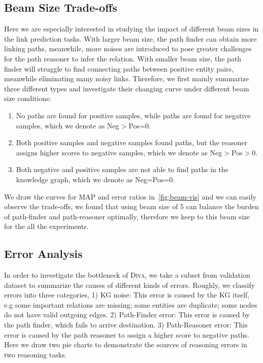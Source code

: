 \documentclass[11pt,a4paper]{article}
\begin{document}
\subsection{Beam Size Trade-offs}
Here we are especially interested in studying the impact of different beam sizes in the link prediction tasks. With larger beam size, the path finder can obtain more linking paths, meanwhile, more noises are introduced to pose greater challenges for the path reasoner to infer the relation. With smaller beam size, the path finder will struggle to find connecting paths between positive entity pairs, meanwhile eliminating many noisy links. Therefore, we first mainly summarize three different types and investigate their changing curve under different beam size conditions: 
\begin{enumerate}
\item No paths are found for positive samples, while paths are found for negative samples, which we denote as Neg$>$Pos=0.
\item Both positive samples and negative samples found paths, but the reasoner assigns higher scores to negative samples, which we denote as Neg$>$Pos$>$0.
\item Both negative and positive samples are not able to find paths in the knowledge graph, which we denote as Neg=Pos=0. 
\end{enumerate}
We draw the curves for MAP and error ratios in~\autoref{fig:beam-vis} and we can easily observe the trade-offs, we found that using beam size of 5 can balance the burden of path-finder and path-reasoner optimally, therefore we keep to this beam size for the all the experiments.

\subsection{Error Analysis}
In order to investigate the bottleneck of \textsc{Diva}, we take a subset from validation dataset to summarize the causes of different kinds of errors. Roughly, we classify errors into three categories, 1) KG noise: This error is caused by the KG itself, e.g some important relations are missing; some entities are duplicate; some nodes do not have valid outgoing edges. 2) Path-Finder error: This error is caused by the path finder, which fails to arrive destination. 3) Path-Reasoner error: This error is caused by the path reasoner to assign a higher score to negative paths. Here we draw two pie charts to demonstrate the sources of reasoning errors in two reasoning tasks.
\end{document}
